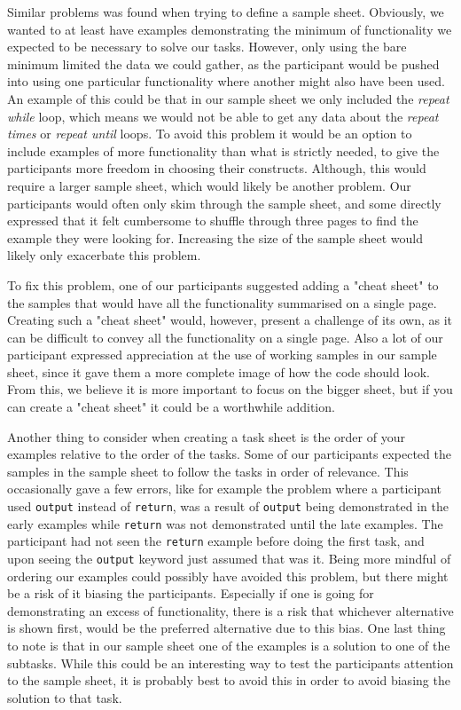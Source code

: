 Similar problems was found when trying to define a sample sheet.
Obviously, we wanted to at least have examples demonstrating the minimum of functionality we expected to be necessary to solve our tasks.
However, only using the bare minimum limited the data we could gather, as the participant would be pushed into using one particular functionality where another might also have been used.
An example of this could be that in our sample sheet we only included the \textit{repeat while} loop, which means we would not be able to get any data about the \textit{repeat times} or \textit{repeat until} loops.
To avoid this problem it would be an option to include examples of more functionality than what is strictly needed, to give the participants more freedom in choosing their constructs.
Although, this would require a larger sample sheet, which would likely be another problem.
Our participants would often only skim through the sample sheet, and some directly expressed that it felt cumbersome to shuffle through three pages to find the example they were looking for.
Increasing the size of the sample sheet would likely only exacerbate this problem.

To fix this problem, one of our participants suggested adding a "cheat sheet" to the samples that would have all the functionality summarised on a single page.
Creating such a "cheat sheet" would, however, present a challenge of its own, as it can be difficult to convey all the functionality on a single page.
Also a lot of our participant expressed appreciation at the use of working samples in our sample sheet, since it gave them a more complete image of how the code should look.
From this, we believe it is more important to focus on the bigger sheet, but if you can create a "cheat sheet" it could be a worthwhile addition.

Another thing to consider when creating a task sheet is the order of your examples relative to the order of the tasks.
Some of our participants expected the samples in the sample sheet to follow the tasks in order of relevance.
This occasionally gave a few errors, like for example the problem where a participant used \lstinline!output! instead of \lstinline!return!, was a result of \lstinline!output! being demonstrated in the early examples while \lstinline!return! was not demonstrated until the late examples.
The participant had not seen the \lstinline!return! example before doing the first task, and upon seeing the \lstinline!output! keyword just assumed that was it.
Being more mindful of ordering our examples could possibly have avoided this problem, but there might be a risk of it biasing the participants.
Especially if one is going for demonstrating an excess of functionality, there is a risk that whichever alternative is shown first, would be the preferred alternative due to this bias.
One last thing to note is that in our sample sheet one of the examples is a solution to one of the subtasks.
While this could be an interesting way to test the participants attention to the sample sheet, it is probably best to avoid this in order to avoid biasing the solution to that task.